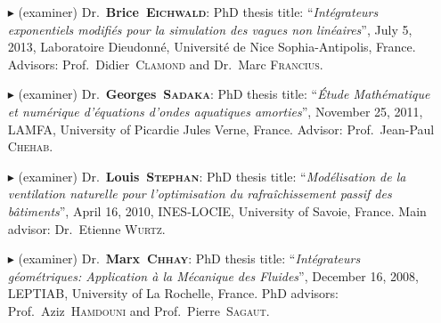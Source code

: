 \begin{itemize}
        \item[$\blacktriangleright$] (examiner) Dr.~\textbf{Brice~\textsc{Eichwald}}: PhD thesis title: ``\textit{Int\'egrateurs exponentiels modifi\'es pour la simulation des vagues non lin\'eaires}'', July 5, 2013, Laboratoire Dieudonn\'e, Universit\'e de Nice Sophia-Antipolis, France. Advisors: Prof.~Didier~\textsc{Clamond} and Dr.~Marc \textsc{Francius}.
        \item[$\blacktriangleright$] (examiner) Dr.~\textbf{Georges~\textsc{Sadaka}}: PhD thesis title: ``\textit{\'Etude Math\'ematique et num\'erique d'\'equations d'ondes aquatiques amorties}'', November 25, 2011, LAMFA, University of Picardie Jules Verne, France. Advisor: Prof.~Jean-Paul \textsc{Chehab}.
        \item[$\blacktriangleright$] (examiner) Dr.~\textbf{Louis~\textsc{Stephan}}: PhD thesis title: ``\textit{Mod\'elisation de la ventilation naturelle pour l'optimisation du rafra\^ichissement passif des b\^atiments}'', April 16, 2010, INES-LOCIE, University of Savoie, France. Main advisor: Dr.~Etienne \textsc{Wurtz}.
        \item[$\blacktriangleright$] (examiner) Dr.~\textbf{Marx~\textsc{Chhay}}: PhD thesis title: ``\textit{Int\'egrateurs g\'eom\'etriques: Application \`a la M\'ecanique des Fluides}'', December 16, 2008, LEPTIAB, University of La Rochelle, France. PhD advisors: Prof.~Aziz~\textsc{Hamdouni} and Prof.~Pierre~\textsc{Sagaut}.
    \end{itemize}